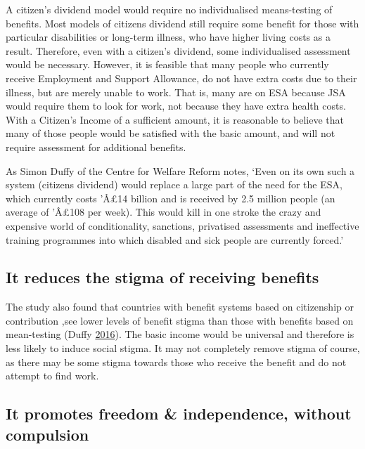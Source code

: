 \documentclass[]{tufte-handout}
\begin{document}
A citizen's dividend model would require no individualised means-testing
of benefits. Most models of citizens dividend still require some benefit
for those with particular disabilities or long-term illness, who have
higher living costs as a result. Therefore, even with a citizen's
dividend, some individualised assessment would be necessary. However, it
is feasible that many people who currently receive Employment and
Support Allowance, do not have extra costs due to their illness, but are
merely unable to work. That is, many are on ESA because JSA would
require them to look for work, not because they have extra health costs.
With a Citizen's Income of a sufficient amount, it is reasonable to
believe that many of those people would be satisfied with the basic
amount, and will not require assessment for additional benefits.

As Simon Duffy of the Centre for Welfare Reform notes, `Even on its own
such a system (citizens dividend) would replace a large part of the need
for the ESA, which currently costs 'Â£14 billion and is received by 2.5
million people (an average of 'Â£108 per week). This would kill in one
stroke the crazy and expensive world of conditionality, sanctions,
privatised assessments and ineffective training programmes into which
disabled and sick people are currently forced.'

\hypertarget{it-reduces-the-stigma-of-receiving-benefits}{%
\subsection{It reduces the stigma of receiving
benefits}\label{it-reduces-the-stigma-of-receiving-benefits}}

The study also found that countries with benefit systems based on
citizenship or contribution ,see lower levels of benefit stigma than
those with benefits based on mean-testing (Duffy
\protect\hyperlink{ref-Duffy}{2016}). The basic income would be
universal and therefore is less likely to induce social stigma. It may
not completely remove stigma of course, as there may be some stigma
towards those who receive the benefit and do not attempt to find work.

\hypertarget{it-promotes-freedom-independence-without-compulsion}{%
\subsection{It promotes freedom \& independence, without
compulsion}\label{it-promotes-freedom-independence-without-compulsion}}
\end{document}
